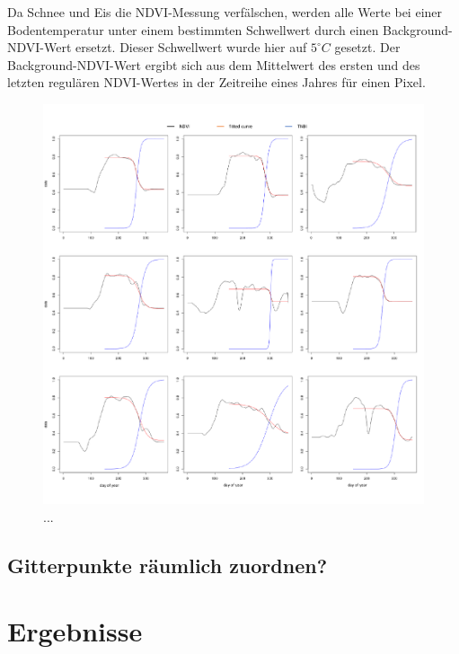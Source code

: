 \documentclass[]{article}
\begin{document}
Da Schnee und Eis die NDVI-Messung verfälschen, werden alle Werte bei einer Bodentemperatur unter einem bestimmten Schwellwert durch einen Background-NDVI-Wert ersetzt. Dieser Schwellwert wurde hier auf $5^\circ C$ gesetzt. Der Background-NDVI-Wert ergibt sich aus dem Mittelwert des ersten und des letzten regulären NDVI-Wertes in der Zeitreihe eines Jahres für einen Pixel.
\begin{figure}
	
  \includegraphics[width=1.\textwidth]{abb1a.pdf}
	\caption{...}
	\label{fig2}
\end{figure}
\subsection{Gitterpunkte räumlich zuordnen?}
\section{Ergebnisse}
\end{document}
